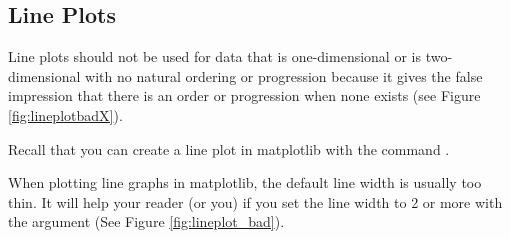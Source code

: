 \subsection*{Line Plots}

Line plots should not be used for data that is one-dimensional or is two-dimensional with no natural ordering or progression because it gives the false impression that there is an order or progression when none exists (see Figure \ref{fig:lineplotbadX}).

Recall that you can create a line plot in matplotlib with the command .

When plotting line graphs in matplotlib, the default line width is usually too thin.  It will help your reader (or you) if you set the line width to 2 or more with the argument  (See Figure \ref{fig:lineplot_bad}).




